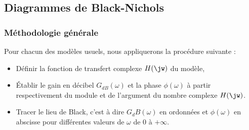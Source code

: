 %    
\clearpage
{}
\captionsetup{width=0.9\linewidth}
\subsection{Diagrammes de Black-Nichols}
\subsubsection{Méthodologie générale}
Pour chacun des modèles usuels, nous appliquerons la procédure suivante :
\begin{itemize}
    \item Définir la fonction de transfert complexe $H(\jw)$ du modèle,
    \item \'Etablir le gain en décibel $G_{dB}(\omega)$ et 
          la phase $\phi(\omega)$ à partir 
          respectivement du module et de l'argument du nombre complexe $H(\jw)$.
    \item Tracer le lieu de Black, c'est à dire $G_dB(\omega)$ en ordonnées 
          et $\phi(\omega)$ en abscisse pour différentes valeurs de $\omega$ 
          de 0 à $+\infty$. 
\end{itemize}
